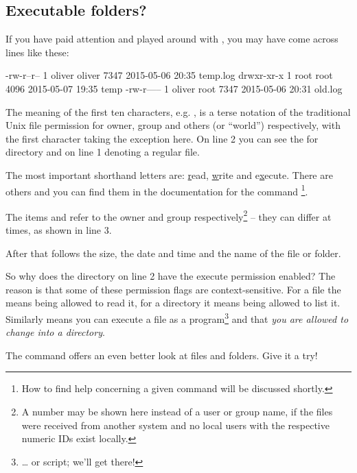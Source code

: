 \documentclass{olli-handout}
\begin{document}
\subsection{Executable folders?}

If you have paid attention and played around with , you may have come across lines like these:

\begin{lstbash}
-rw-r--r-- 1 oliver oliver      7347 2015-05-06 20:35 temp.log
drwxr-xr-x 1 root   root        4096 2015-05-07 19:35 temp
-rw-r----- 1 oliver root        7347 2015-05-06 20:31 old.log
\end{lstbash}

The meaning of the first ten characters, e.g. , is a terse notation of the traditional Unix file permission for owner, group and others (or ``world'') respectively, with the first character taking the exception here. On line 2 you can see the  for directory and on line 1 \TT{-} denoting a regular file.

The most important shorthand letters are: \underline{r}ead, \underline{w}rite and e\underline{x}ecute. There are others and you can find them in the documentation for the command \footnote{How to find help concerning a given command will be discussed shortly.}.

The items  and  refer to the owner and group respectively\footnote{A number may be shown here instead of a user or group name, if the files were received from another system and no local users with the respective numeric IDs exist locally.} -- they can differ at times, as shown in line 3.

After that follows the size, the date and time and the name of the file or folder.

\begin{hintbox}
{\olliHandLeft} So why does the directory on line 2 have the execute permission enabled? The reason is that some of these permission flags are context-sensitive. For a file the  means being allowed to read it, for a directory it means being allowed to list it. Similarly  means you can execute a file as a program\footnote{\ldots{} or script; we'll get there!} and that \emph{you are allowed to change into a directory}.

{\olliPenRD} The  command offers an even better look at files and folders. Give it a try!
\end{hintbox}
\end{document}
